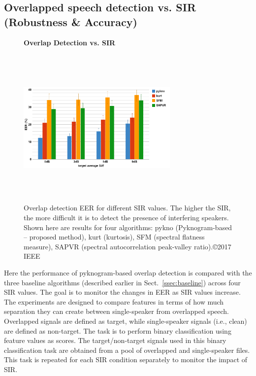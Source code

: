 {\subsection{Overlapped speech detection vs. SIR (Robustness \& Accuracy)}
\label{sssec:ovl_frame_vs_sir}
\begin{figure}[b!]
	\centering
	\hspace{-1mm}
	\textbf{Overlap Detection vs. SIR}\par\medskip
	\includegraphics[height = 3.1in, width=0.7\textwidth]{figures/ovldet_vs_sir}
	\vspace{-1mm}
	\caption{ Overlap detection EER for different SIR values. The higher the SIR, the more difficult it is to detect the presence of interfering speakers. Shown here are results for four algorithms: pykno (Pyknogram-based -- proposed method), kurt (kurtosis), SFM (spectral flatness measure), SAPVR (spectral autocorrelation peak-valley ratio).\copyright 2017 IEEE}
	\vspace{0mm}
	\label{fig:ch2_ovl_det}
\end{figure}
Here the performance of pyknogram-based overlap detection is compared with the three baseline algorithms (described earlier in Sect.~\ref{ssec:baseline}) across four SIR values. 
The goal is to monitor the changes in EER as SIR values increase. 
The experiments are designed to compare features in terms of how much separation they can create between single-speaker from overlapped speech. 
Overlapped signals are defined as target, while single-speaker signals (i.e., clean) are defined as non-target. 
The task is to perform binary classification using feature values as scores. 
The target/non-target signals used in this binary classification task are obtained from a pool of overlapped and single-speaker files. 
This task is repeated for each SIR condition separately to monitor the impact of SIR. 
}
